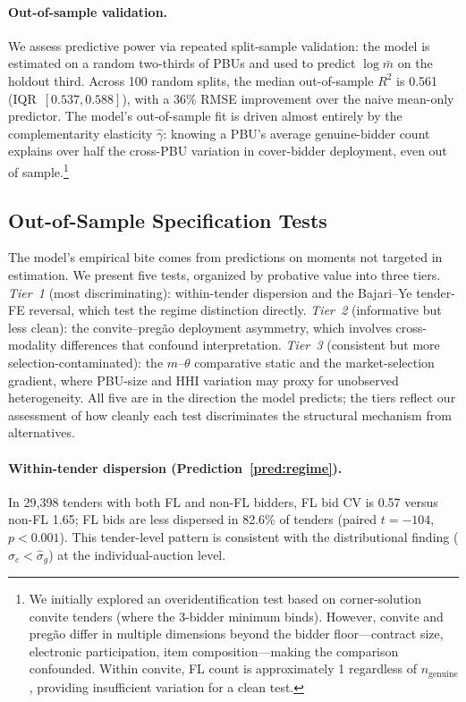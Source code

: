 \paragraph{Out-of-sample validation.}
We assess predictive power via repeated split-sample validation:
the model is estimated on a random two-thirds of PBUs and used to
predict $\log \bar{m}$ on the holdout third. Across 100 random
splits, the median out-of-sample $R^2$ is 0.561
(IQR~$[0.537, 0.588]$), with a 36\% RMSE improvement over the
naive mean-only predictor. The model's out-of-sample fit is driven
almost entirely by the complementarity elasticity $\hat{\gamma}$:
knowing a PBU's average genuine-bidder count explains over half the
cross-PBU variation in cover-bidder deployment, even out of
sample.\footnote{We initially explored an overidentification test
based on corner-solution convite tenders (where the 3-bidder
minimum binds). However, convite and preg\~ao differ in multiple
dimensions beyond the bidder floor---contract size, electronic
participation, item composition---making the comparison confounded.
Within convite, FL count is approximately 1 regardless of
$n_{\text{genuine}}$, providing insufficient variation for a clean
test.}


\subsection{Out-of-Sample Specification Tests}
\label{sec:spec_tests}

The model's empirical bite comes from predictions on moments not
targeted in estimation. We present five tests, organized by
probative value into three tiers. \emph{Tier~1} (most
discriminating): within-tender dispersion and the Bajari--Ye
tender-FE reversal, which test the regime distinction directly.
\emph{Tier~2} (informative but less clean): the convite--preg\~ao
deployment asymmetry, which involves cross-modality differences
that confound interpretation. \emph{Tier~3} (consistent but more
selection-contaminated): the $m$--$\theta$ comparative static and
the market-selection gradient, where PBU-size and HHI variation
may proxy for unobserved heterogeneity. All five are in the
direction the model predicts; the tiers reflect our assessment of
how cleanly each test discriminates the structural mechanism from
alternatives.

\paragraph{Within-tender dispersion (Prediction~\ref{pred:regime}).}
In 29,398 tenders with both FL and non-FL bidders, FL bid CV is 0.57
versus non-FL 1.65; FL bids are less dispersed in 82.6\% of tenders
(paired $t = -104$, $p < 0.001$). This tender-level pattern is
consistent with the distributional finding
($\hat{\sigma}_c < \hat{\sigma}_g$) at the individual-auction level.


